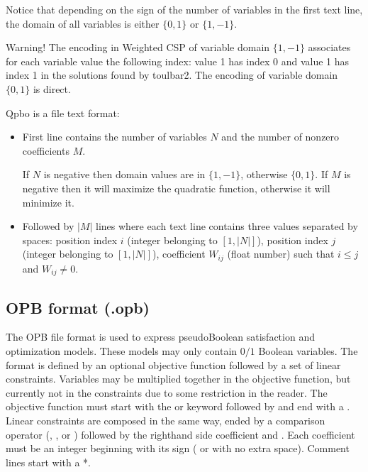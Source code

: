 \documentclass[letterpaper,10pt,openany,oneside,english]{sphinxmanual}
\begin{document}
\sphinxAtStartPar
Notice that depending on the sign of the number of variables in the first text line, the domain of all variables is either \(\{0,1\}\) or \(\{1,-1\}\).

\sphinxAtStartPar
Warning! The encoding in Weighted CSP of variable domain \(\{1,-1\}\) associates for each variable value the following index: value 1 has index 0 and value \sphinxhyphen{}1 has index 1 in the solutions found by toulbar2.
The encoding  of variable domain \(\{0,1\}\) is direct.

\sphinxAtStartPar
Qpbo is a file text format:
\begin{itemize}
\item {} 
\sphinxAtStartPar
First line contains the number of variables \(N\) and the number of non\sphinxhyphen{}zero coefficients \(M\).

\sphinxAtStartPar
If \(N\) is negative then domain values are in \(\{1, -1\}\), otherwise \(\{0, 1\}\).
If \(M\) is negative then it will maximize the quadratic function, otherwise it will minimize it.

\item {} 
\sphinxAtStartPar
Followed by \(|M|\) lines where each text line contains three values separated by spaces:
position index \(i\) (integer belonging to \([1,|N|]\)),
position index \(j\) (integer belonging to \([1,|N|]\)),
coefficient \(W_{ij}\) (float number)
such that \(i \leq j\) and \(W_{ij} \neq 0\).

\end{itemize}

\sphinxstepscope


\subsection{OPB format (.opb)}
\label{\detokenize{formats/opbformat:opb-format-opb}}\label{\detokenize{formats/opbformat:opb-format}}\label{\detokenize{formats/opbformat::doc}}
\sphinxAtStartPar
The OPB file format is used to express pseudo\sphinxhyphen{}Boolean satisfaction and optimization models.
These models may only contain \(0/1\) Boolean variables. The format is defined by an optional objective function followed by a set of linear constraints.
Variables may be multiplied together in the objective function, but currently not in the constraints due to some restriction in the reader.
The objective function must start with the  or  keyword followed by  and end with a \sphinxstylestrong{;}.
Linear constraints are composed in the same way, ended by a comparison operator (\sphinxstylestrong{\textless{}=}, \sphinxstylestrong{\textgreater{}=}, or \sphinxstylestrong{!=}) followed by the right\sphinxhyphen{}hand side coefficient and \sphinxstylestrong{;}.
Each coefficient must be an integer beginning with its sign (\sphinxstylestrong{+} or \sphinxstylestrong{\sphinxhyphen{}} with no extra space).
Comment lines start with a *.
\end{document}
